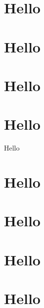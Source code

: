 \documentclass[a4paper,11pt,twoside,palatino]{report}
\begin{document}
\chapter{Hello}

\faketableofcontents
\adjustmtc[8]
\mtcaddchapter
%
\chapter{Hello}

\faketableofcontents
\adjustmtc[9]
\mtcaddchapter
%
\chapter{Hello}

\faketableofcontents
\adjustmtc[10]
\mtcaddchapter
%
\chapter{Hello}


\singlespacing
{}
\small

%
Hello
\normalsize


\appendix
\chapter{Hello}
\chapter{Hello}
\chapter{Hello}
\chapter{Hello}
% 
% 
% 
% 
\end{document}
